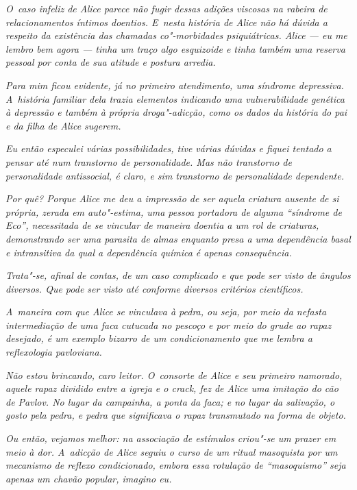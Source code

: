 \emph{O~caso infeliz de Alice parece não fugir dessas adições viscosas
na rabeira de relacionamentos íntimos doentios. E~nesta história de
Alice não há dúvida a respeito da existência das chamadas co"-morbidades
psiquiátricas. Alice --- eu me lembro bem agora --- tinha um traço algo
esquizoide e tinha também uma reserva pessoal por conta de sua atitude e
postura arredia.}

\emph{Para mim ficou evidente, já no primeiro atendimento, uma síndrome
depressiva. A~história familiar dela trazia elementos indicando uma
vulnerabilidade genética à depressão e também à própria droga"-adicção,
como os dados da história do pai e da filha de Alice sugerem.}

\emph{Eu então especulei várias possibilidades, tive várias dúvidas e
fiquei tentado a pensar até num transtorno de personalidade. Mas não
transtorno de personalidade antissocial, é claro, e sim transtorno de
personalidade dependente.}

\emph{Por quê? Porque Alice me deu a impressão de ser aquela criatura
ausente de si própria, zerada em auto"-estima, uma pessoa portadora de
alguma ``síndrome de Eco'', necessitada de se vincular de maneira
doentia a um rol de criaturas, demonstrando ser uma parasita de almas
enquanto presa a uma dependência basal e intransitiva da qual a
dependência química é apenas consequência.}

\emph{Trata"-se, afinal de contas, de um caso complicado e que pode ser
visto de ângulos diversos. Que pode ser visto até conforme diversos
critérios científicos.}

\emph{A~maneira com que Alice se vinculava à pedra, ou seja, por meio da
nefasta intermediação de uma faca cutucada no pescoço e por meio do
grude ao rapaz desejado, é um exemplo bizarro de um condicionamento que
me lembra a reflexologia pavloviana.}

\emph{Não estou brincando, caro leitor. O~consorte de Alice e seu
primeiro namorado, aquele rapaz dividido entre a igreja e o crack, fez
de Alice uma imitação do cão de Pavlov. No lugar da campainha, a ponta
da faca; e no lugar da salivação, o gosto pela pedra, e pedra que
significava o rapaz transmutado na forma de objeto.}

\emph{Ou então, vejamos melhor: na associação de estímulos criou"-se um
prazer em meio à dor. A~adicção de Alice seguiu o curso de um ritual
masoquista por um mecanismo de reflexo condicionado, embora essa
rotulação de ``masoquismo'' seja apenas um chavão popular, imagino eu.}

